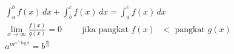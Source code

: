 \noindent \begin{align}
	\label{equ:integral}
	\int_{a}^{b} f(x)\, dx + \int_{b}^{c} f(x) \, dx = \int_{a}^{c} f(x) \, dx \\
	\label{equ:limit}
	\lim_{x \to \infty} \frac{f(x)}{g(x)} = 0 \hspace{1cm}
	\text{jika pangkat $f(x)$ $<$ pangkat $g(x)$} \\
	\label{equ:eksponen}
	a^{m^{a \, ^{n}\log b }} = b^{\frac{m}{n}}
\end{align}

